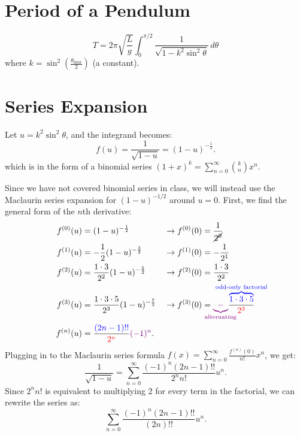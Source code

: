 \documentclass[12pt]{article}
\begin{document}
\section{Period of a Pendulum}
\[
  T = 2\pi \sqrt{\frac{L}{g}} \int_{0}^{\pi/2} \frac{1}{\sqrt{1 - k^2
  \sin^2 \theta}} \, d\theta
\]
where $k = \sin^2\left(\frac{\theta_{\mathrm{max}}}{2}\right)$ (a constant).

\section{Series Expansion}
Let $u = k^2 \sin^2 \theta$, and the integrand becomes:
\[
  f(u) = \frac{1}{\sqrt{1 - u}} = (1 - u)^{-\frac{1}{2}}.
\]
which is in the form of a binomial series $(1+x)^k =
\sum_{n=0}^{\infty} \binom{k}{n} x^n$.

Since we have not covered binomial series in class, we will instead
use the Maclaurin series expansion for $(1 - u)^{-1/2}$ around $u = 0$. First, we find the general form of the $n$th derivative:
\begin{align*}
  f^{(0)}(u) &= (1-u)^{-\frac{1}{2}} &&\rightarrow f^{(0)}(0) = \frac{1}{\cancel{2^0}} \\
  f^{(1)}(u) &= -\frac{1}{2} (1-u)^{-\frac{3}{2}} &&\rightarrow f^{(1)}(0) = -\frac{1}{2^1} \\
  f^{(2)}(u) &= \frac{1\cdot3}{2^2} (1-u)^{-\frac{5}{2}} &&\rightarrow f^{(2)}(0) = \frac{1\cdot3}{2^2} \\
  f^{(3)}(u) &= \frac{1\cdot3\cdot5}{2^3} (1-u)^{-\frac{7}{2}} &&\rightarrow f^{(3)}(0) = {\color{violet}\underbrace{-}_{\mathclap{\text{alternating}}}} \frac{\color{blue}\overbrace{1\cdot3\cdot5}^{\mathclap{\text{odd-only factorial}}}}{\color{red}2^3} \\
  f^{(n)}(u) &= \frac{{\color{blue}(2n-1)!!}}{{\color{red}2^n}} {\color{violet}(-1)^n}.
\end{align*}
Plugging in to the Maclaurin series formula $f(x) = \sum_{n=0}^{\infty} \frac{f^{(n)}(0)}{n!} x^n$, we get:
\[
  \frac{1}{\sqrt{1 - u}} = \sum_{n=0}^{\infty} \frac{(-1)^n (2n-1)!!}{2^n n!} u^n.
\]
Since $2^n n!$ is equivalent to multiplying 2 for every term in the factorial, we can rewrite the series as:
\[
  \sum_{n=0}^{\infty} \frac{(-1)^n (2n-1)!!}{(2n)!!} u^n.
\]
\end{document}

